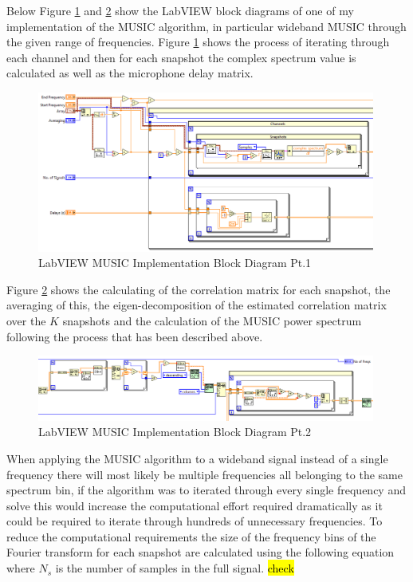 \documentclass{UoNMCHA}
\numberwithin{equation}{section}
\begin{document}
    Below Figure \ref{fig:MUSICBlockPt1} and \ref{fig:MUSICBlockPt2} show the LabVIEW block diagrams of one of my implementation of the MUSIC algorithm, in particular wideband MUSIC through the given range of frequencies. Figure \ref{fig:MUSICBlockPt1} shows the process of iterating through each channel and then for each snapshot the complex spectrum value is calculated as well as the microphone delay matrix.
    
    \begin{figure}[H]
        \centering
        \includegraphics[keepaspectratio, width = 0.99\textwidth, frame]{Figures/MUSCBlockPt1.png}
        \caption{LabVIEW MUSIC Implementation Block Diagram Pt.1}
        \label{fig:MUSICBlockPt1}
    \end{figure}
    
    Figure \ref{fig:MUSICBlockPt2} shows the calculating of the correlation matrix for each snapshot, the averaging of this, the eigen-decomposition of the estimated correlation matrix over the $K$ snapshots and the calculation of the MUSIC power spectrum following the process that has been described above.

    \begin{figure}[H]
        \centering
        \includegraphics[keepaspectratio, width = 0.99\textwidth, frame]{Figures/MUSICBlockPt2.png}
        \caption{LabVIEW MUSIC Implementation Block Diagram Pt.2}
        \label{fig:MUSICBlockPt2}
    \end{figure}
    
    When applying the MUSIC algorithm to a wideband signal instead of a single frequency there will most likely be multiple frequencies all belonging to the same spectrum bin, if the algorithm was to iterated through every single frequency and solve this would increase the computational effort required dramatically as it could be required to iterate through hundreds of unnecessary frequencies. To reduce the computational requirements the size of the frequency bins of the Fourier transform for each snapshot are calculated using the following equation where $N_s$ is the number of samples in the full signal. \hl{check}
    
\end{document}
